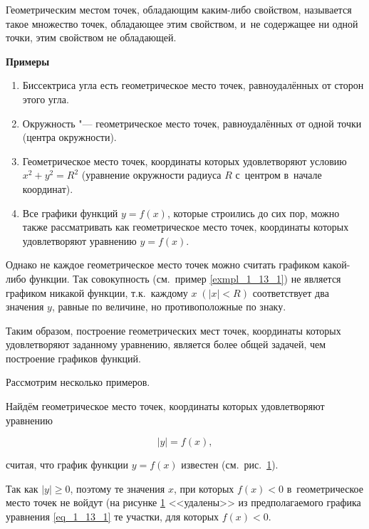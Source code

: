 \begin{Def}
Геометрическим местом точек, обладающим каким-либо свойством, называется такое
множество точек, обладающее этим свойством, и~не содержащее ни одной точки,
этим свойством не обладающей.
\end{Def}

\textbf{Примеры}
\begin{enumerate}
\item Биссектриса угла есть геометрическое место точек, равноудалённых
от сторон этого угла.
\item Окружность "--- геометрическое место точек, равноудалённых от одной точки
(центра окружности).
\item Геометрическое место точек, координаты которых удовлетворяют условию
$x^{2} + y^{2} = R^{2}$ (уравнение окружности радиуса $R$ с~центром
в~начале координат).\label{exmpl_1_13_1}
\item Все графики функций $y = f(x)$, которые строились до сих пор,
можно также рассматривать как геометрическое место точек,
координаты которых удовлетворяют уравнению $y = f(x)$.
\end{enumerate}

Однако не каждое геометрическое место точек можно считать графиком какой-либо
функции. Так совокупность (см.\ пример \ref{exmpl_1_13_1}) не является графиком никакой функции,
т.к.\ каждому $x \;(|x| < R)$ соответствует два значения $y$, равные по величине,
но противоположные по знаку.

Таким образом, построение геометрических мест точек, координаты которых
удовлетворяют заданному уравнению, является более общей задачей,
чем построение графиков функций.

Рассмотрим несколько примеров.

Найдём геометрическое место точек, координаты которых удовлетворяют уравнению

\begin{equation}\label{eq_1_13_1}
|y| = f(x),
\end{equation}

считая, что график функции $y = f(x)$ известен (см.\ рис.\ \ref{fig_1_13_1}).

\begin{figure}\label{fig_1_13_1}
\end{figure}

Так как $|y| \geqslant 0$, поэтому те значения $x$, при которых
$f(x) < 0$ в~геометрическое место точек не войдут (на рисунке \ref{fig_1_13_1}
<<удалены>> из предполагаемого графика уравнения \eqref{eq_1_13_1}
те участки, для которых $f(x) < 0$.

